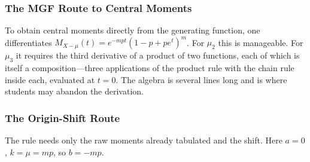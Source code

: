 \documentclass[
  12pt]{article}
\begin{document}
\subsubsection{The MGF Route to Central Moments}

To obtain central moments directly from the generating function, one differentiates
$M_{X-\mu}(t) = e^{-mpt} (1 - p + p e^t)^m$.
For $\mu_2$ this is manageable. For $\mu_3$ it requires the third derivative of a product of two functions, each of which is itself a composition---three applications of the product rule with the chain rule inside each, evaluated at $t = 0$. The algebra is several lines long and is where students may abandon the derivation.

\subsubsection{The Origin-Shift Route}\label{sec-binom-shift}

The rule needs only the raw moments already tabulated and the shift. Here $a = 0$, $k = \mu = mp$, so $b = -mp$.
\end{document}
